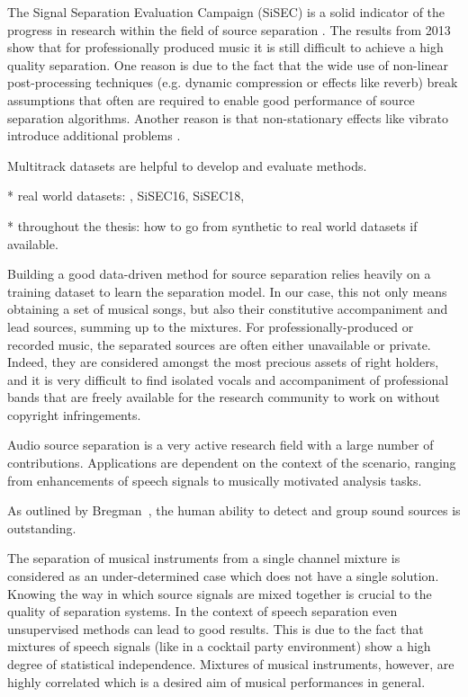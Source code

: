 The Signal Separation Evaluation Campaign (SiSEC) is a solid indicator of the progress in research within the field of source separation \cite{vincent12}. The results from 2013 \cite{sisec13} show that for professionally produced music it is still difficult to achieve a high quality separation.
One reason is due to the fact that the wide use of non-linear post-processing techniques (e.g. dynamic compression or effects like reverb) break assumptions that often are required to enable good performance of source separation algorithms. Another reason is that non-stationary effects like vibrato introduce additional problems \cite{nakano10}.

Multitrack datasets are helpful to develop and evaluate methods.

* real world datasets: , SiSEC16, SiSEC18,

* throughout the thesis: how to go from synthetic to real world datasets if available.

Building a good data-driven method for source separation relies heavily on a training dataset to learn the separation model. In our case, this not only means obtaining a set of musical songs, but also their constitutive accompaniment and lead sources, summing up to the mixtures. For professionally-produced or recorded music, the separated sources are often either unavailable or private. Indeed, they are considered amongst the most precious assets of right holders, and it is very difficult to find isolated vocals and accompaniment of professional bands that are freely available for the research community to work on without copyright infringements.

Audio source separation is a very active research field with a large number of contributions. Applications are dependent on the context of the scenario, ranging from enhancements of speech signals to musically motivated analysis tasks.

As outlined by Bregman~\cite{bregman94}, the human ability to detect and group sound sources is outstanding.

The separation of musical instruments from a single channel mixture is considered as an under-determined case which does not have a single solution. Knowing the way in which source signals are mixed together is crucial to the quality of separation systems. In the context of speech separation even unsupervised methods can lead to good results. This is due to the fact that mixtures of speech signals (like in a cocktail party environment) show a high degree of statistical independence. Mixtures of musical instruments, however, are highly correlated which is a desired aim of musical performances in general.

